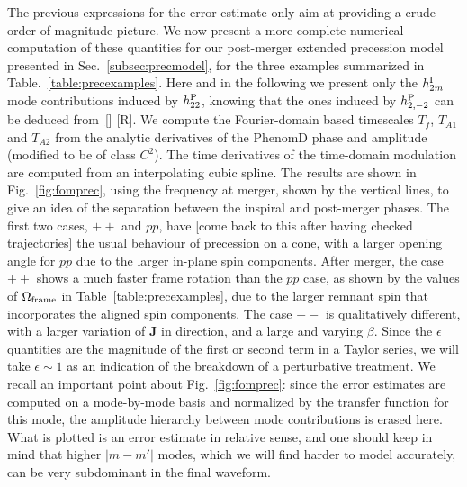 \documentclass[aps,showpacs,twocolumn,
prd,superscriptaddress,nofootinbib]{revtex4-1}
\newcommand{\SM}[1]{{\color{Red} #1}}
\begin{document}
The previous expressions for the error estimate only aim at providing a crude order-of-magnitude picture. We now present a more complete numerical computation of these quantities for our post-merger extended precession model presented in Sec.~\ref{subsec:precmodel}, for the three examples summarized in Table.~\ref{table:precexamples}. Here and in the following we present only the $h^{\rm I}_{2 m}$ mode contributions induced by $h^{\rm P}_{22}$, knowing that the ones induced by $h^{\rm P}_{2,-2}$ can be deduced from~\eqref{} \SM{[R]}. We compute the Fourier-domain based timescales $T_{f}$, $T_{A1}$ and $T_{A2}$ from the analytic derivatives of the PhenomD phase and amplitude (modified to be of class $C^{2}$). The time derivatives of the time-domain modulation are computed from an interpolating cubic spline. The results are shown in Fig.~\ref{fig:fomprec}, using the frequency at merger, shown by the vertical lines, to give an idea of the separation between the inspiral and post-merger phases. The first two cases, $++$ and $pp$, have \SM{[come back to this after having checked trajectories]} the usual behaviour of precession on a cone, with a larger opening angle for $pp$ due to the larger in-plane spin components. After merger, the case $++$ shows a much faster frame rotation than the $pp$ case, as shown by the values of $\Omega_{\rm frame}$ in Table~\ref{table:precexamples}, due to the larger remnant spin that incorporates the aligned spin components. The case $--$ is qualitatively different, with a larger variation of $\bm{J}$ in direction, and a large and varying $\beta$. Since the $\epsilon$ quantities are the magnitude of the first or second term in a Taylor series, we will take $\epsilon \sim 1$ as an indication of the breakdown of a perturbative treatment. We recall an important point about Fig.~\ref{fig:fomprec}: since the error estimates are computed on a mode-by-mode basis and normalized by the transfer function for this mode, the amplitude hierarchy between mode contributions is erased here. What is plotted is an error estimate in relative sense, and one should keep in mind that higher $|m-m'|$ modes, which we will find harder to model accurately, can be very subdominant in the final waveform.
\end{document}
